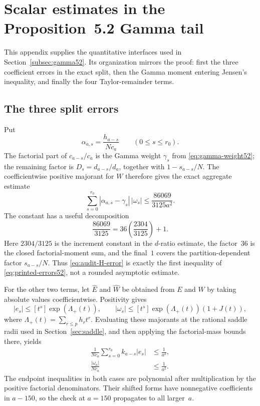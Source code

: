 \documentclass[11pt]{article}
\theoremstyle{definition}
\theoremstyle{remark}
\begin{document}
\section{Scalar estimates in the Proposition~5.2 Gamma tail}
\label{app:gamma-tail-audit}

This appendix supplies the quantitative interfaces used in
Section~\ref{subsec:gamma52}.  Its organization mirrors the proof: first the
three coefficient errors in the exact split, then the Gamma moment entering
Jensen's inequality, and finally the four Taylor-remainder terms.

\subsection{The three split errors}

Put
\[
 \alpha_{a,s}=\frac{h_{a-s}}{Nc_a}
 \qquad(0\le s\le r_0).
\]
The factorial part of $c_{a-s}/c_a$ is the Gamma weight $\gamma_s$ from
\eqref{eq:gamma-weight52}; the remaining factor is
$D_s=d_{a-s}/d_a$, together with $1-s_{a-s}/N$.  The coefficientwise positive
majorant for $W$ therefore gives the exact aggregate estimate
\begin{equation}\label{eq:audit-H-error}
 \sum_{s=0}^{r_0}|\alpha_{a,s}-\gamma_s|\,|\omega_s|
 \le \frac{86069}{3125a^2}.
\end{equation}
The constant has a useful decomposition
\[
 \frac{86069}{3125}=36\left(\frac{2304}{3125}\right)+1.
\]
Here $2304/3125$ is the increment constant in the $d$-ratio estimate, the
factor~$36$ is the closed factorial-moment sum, and the final~$1$ covers the
partition-dependent factor $s_{a-s}/N$.  Thus
\eqref{eq:audit-H-error} is exactly the first inequality of
\eqref{eq:printed-errors52}, not a rounded asymptotic estimate.

For the other two terms, let $\widehat E$ and $\widehat W$ be obtained from
$E$ and $W$ by taking absolute values coefficientwise.  Positivity gives
\[
 |e_s|\le[t^s]\exp(\Lambda_+(t)),
 \qquad
 |\omega_s|\le[t^s]\exp(\Lambda_+(t))(1+J(t)),
\]
where $\Lambda_+(t)=\sum_{r\le p}h_rt^r$.  Evaluating these majorants at the
rational saddle radii used in Section~\ref{sec:saddle}, and then applying the
factorial-mass bounds there, yields
\begin{align}
 \frac1{Nc_a}\sum_{s=0}^{r_0}k_{a-s}|e_s|
 &\le\frac1{a^2},                                             \label{eq:audit-K-error}\\
 \frac{|\omega_a|}{Nc_a}
 &\le\frac1{a^2}.                                             \label{eq:audit-Omega-error}
\end{align}
The endpoint inequalities in both cases are polynomial after multiplication
by the positive factorial denominators.  Their shifted forms have
nonnegative coefficients in $a-150$, so the check at $a=150$ propagates to
all larger~$a$.
\end{document}
